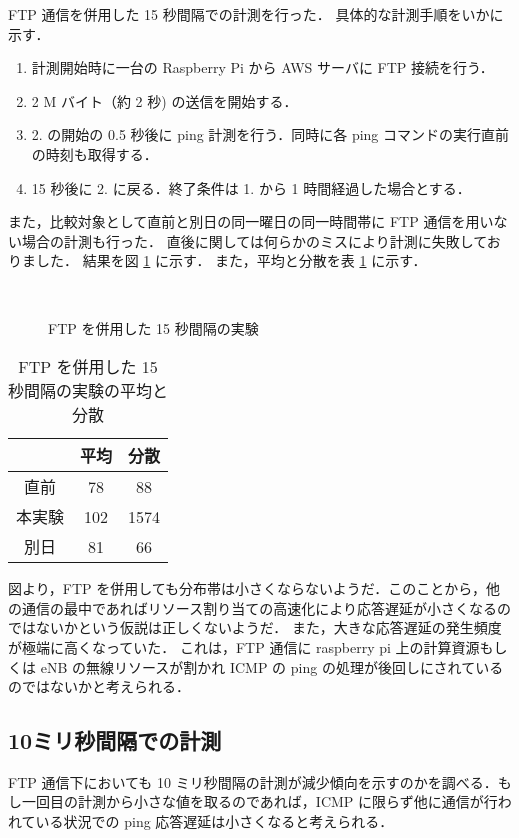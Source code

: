 \documentclass[a4j]{jarticle}
\begin{document}
FTP 通信を併用した 15 秒間隔での計測を行った．
具体的な計測手順をいかに示す．
\begin{enumerate}
\item 計測開始時に一台の Raspberry Pi から AWS サーバに FTP 接続を行う．
\item 2 M バイト（約 2 秒) の送信を開始する．
\item 2. の開始の 0.5 秒後に ping 計測を行う．同時に各 ping コマンドの実行直前の時刻も取得する．
\item 15 秒後に 2. に戻る．終了条件は 1. から 1 時間経過した場合とする．
\end{enumerate}
また，比較対象として直前と別日の同一曜日の同一時間帯に FTP 通信を用いない場合の計測も行った．
直後に関しては何らかのミスにより計測に失敗しておりました．
結果を図 \ref{15s} に示す．
また，平均と分散を表 \ref{15s-stat} に示す．
\begin{figure}[tb]
\begin{center}
~
\\
\caption{FTP を併用した 15 秒間隔の実験}
\label{15s}
\end{center}
\end{figure}
\begin{table}[tb]
\begin{center}
\caption{FTP を併用した 15 秒間隔の実験の平均と分散}
\label{15s-stat}
\begin{tabular}{|c|c|c|}
\hline
&平均 &分散\\
\hline
直前&78&88\\
\hline
本実験&102&1574\\
\hline
別日&81&66\\
\hline
\end{tabular}
\end{center}
\end{table}
図より，FTP を併用しても分布帯は小さくならないようだ．このことから，他の通信の最中であればリソース割り当ての高速化により応答遅延が小さくなるのではないかという仮説は正しくないようだ．
また，大きな応答遅延の発生頻度が極端に高くなっていた．
これは，FTP 通信に raspberry pi 上の計算資源もしくは eNB の無線リソースが割かれ ICMP の ping の処理が後回しにされているのではないかと考えられる．

\subsection{10ミリ秒間隔での計測}
FTP 通信下においても 10 ミリ秒間隔の計測が減少傾向を示すのかを調べる．もし一回目の計測から小さな値を取るのであれば，ICMP に限らず他に通信が行われている状況での ping 応答遅延は小さくなると考えられる．
\end{document}
